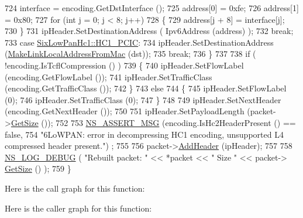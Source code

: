 \begin{DoxyCode}
724       \textcolor{keyword}{interface }= encoding.GetDstInterface ();
725       address[0] = 0xfe;
726       address[1] = 0x80;
727       \textcolor{keywordflow}{for} (\textcolor{keywordtype}{int} j = 0; j < 8; j++)
728         \{
729           address[j + 8] = interface[j];
730         \}
731       ipHeader.SetDestinationAddress ( Ipv6Address (address) );
732       \textcolor{keywordflow}{break};
733     \textcolor{keywordflow}{case} \hyperlink{classns3_1_1SixLowPanHc1_a29c864d9bf6bc466ee2214a95a83dcada2e3b9656c8f4d8912d0bf078533e298f}{SixLowPanHc1::HC1\_PCIC}:
734       ipHeader.SetDestinationAddress (\hyperlink{classns3_1_1SixLowPanNetDevice_acf66b0ff019d0f1b88212d452044696e}{MakeLinkLocalAddressFromMac} (dst));
735       \textcolor{keywordflow}{break};
736     \}
737 
738   \textcolor{keywordflow}{if} ( !encoding.IsTcflCompression () )
739     \{
740       ipHeader.SetFlowLabel (encoding.GetFlowLabel ());
741       ipHeader.SetTrafficClass (encoding.GetTrafficClass ());
742     \}
743   \textcolor{keywordflow}{else}
744     \{
745       ipHeader.SetFlowLabel (0);
746       ipHeader.SetTrafficClass (0);
747     \}
748 
749   ipHeader.SetNextHeader (encoding.GetNextHeader ());
750 
751   ipHeader.SetPayloadLength (packet->\hyperlink{classns3_1_1Packet_a462855c9929954d4301a4edfe55f4f1c}{GetSize} ());
752 
753   \hyperlink{assert_8h_aff5ece9066c74e681e74999856f08539}{NS\_ASSERT\_MSG} (encoding.IsHc2HeaderPresent () == \textcolor{keyword}{false},
754                  \textcolor{stringliteral}{"6LoWPAN: error in decompressing HC1 encoding, unsupported L4 compressed header present."})
      ;
755 
756   packet->\hyperlink{classns3_1_1Packet_a465108c595a0bc592095cbcab1832ed8}{AddHeader} (ipHeader);
757 
758   \hyperlink{group__logging_ga413f1886406d49f59a6a0a89b77b4d0a}{NS\_LOG\_DEBUG} ( \textcolor{stringliteral}{"Rebuilt packet: "} << *packet << \textcolor{stringliteral}{" Size "} << packet->
      \hyperlink{classns3_1_1Packet_a462855c9929954d4301a4edfe55f4f1c}{GetSize} () );
759 \}
\end{DoxyCode}


Here is the call graph for this function\+:




Here is the caller graph for this function\+:


